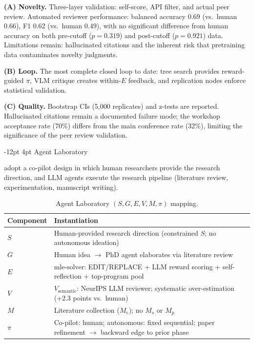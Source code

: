 \documentclass[11pt]{article}
\makeatletter
\renewcommand\subsection{\@startsection{subsection}{2}{\z@}%
  {-12pt \@plus -2pt \@minus -2pt}%
  {4pt \@plus 1pt}%
  {\normalfont\normalsize\bfseries}}
\newcommand{\sgmvpi}{$(S, G, E, V, M, \pi)$}
\makeatother
\begin{document}
\noindent\textbf{(A) Novelty.} Three-layer validation: self-score, API filter, and actual peer review. Automated reviewer performance: balanced accuracy 0.69 (vs.\ human 0.66), F1 0.62 (vs.\ human 0.49), with no significant difference from human accuracy on both pre-cutoff ($p=0.319$) and post-cutoff ($p=0.921$) data. Limitations remain: hallucinated citations and the inherent risk that pretraining data contaminates novelty judgments.

\noindent\textbf{(B) Loop.} The most complete closed loop to date: tree search provides reward-guided $\pi$, VLM critique creates within-$E$ feedback, and replication nodes enforce statistical validation.

\noindent\textbf{(C) Quality.} Bootstrap CIs (5,000 replicates) and z-tests are reported. Hallucinated citations remain a documented failure mode; the workshop acceptance rate (70\%) differs from the main conference rate (32\%), limiting the significance of the peer review validation.

\subsection{Agent Laboratory}
\label{sec:agentlab}

\citet{schmidgall2025agentlab} adopt a co-pilot design in which human researchers provide the research direction, and LLM agents execute the research pipeline (literature review, experimentation, manuscript writing).

\begin{table}[h]
\centering
\small
\begin{tabular}{@{}lp{9cm}@{}}
\toprule
Component & Instantiation \\
\midrule
$S$ & Human-provided research direction (constrained $S$; no autonomous ideation) \\
$G$ & Human idea $\rightarrow$ PhD agent elaborates via literature review \\
$E$ & mle-solver: EDIT/REPLACE + LLM reward scoring + self-reflection + top-program pool \\
$V$ & $V_\text{semantic}$: NeurIPS LLM reviewer; systematic over-estimation (+2.3 points vs.\ human) \\
$M$ & Literature collection ($M_e$); no $M_s$ or $M_p$ \\
$\pi$ & Co-pilot: human; autonomous: fixed sequential; paper refinement $\rightarrow$ backward edge to prior phase \\
\bottomrule
\end{tabular}
\caption{Agent Laboratory \sgmvpi{} mapping.}
\end{table}
\end{document}
